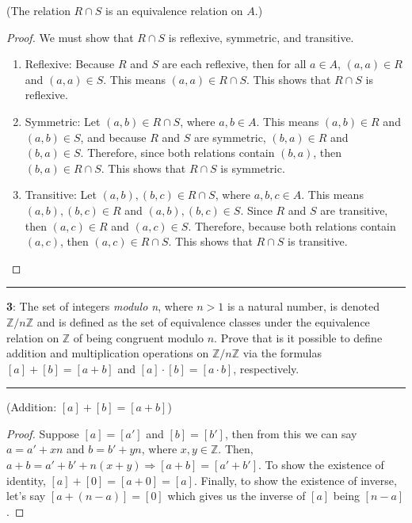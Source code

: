 \documentclass[11pt]{article}
\newcommand\question[2]{\vspace{.25in}\hrule\textbf{#1}: #2\vspace{.5em}\hrule\vspace{.10in}}
\renewcommand\part[1]{\vspace{.10in}(#1)\par}
\newcommand{\Z}{\mathbb{Z}}
\begin{document}
\part{The relation $R \cap S$ is an equivalence relation on $A$.}
\begin{proof}
	We must show that $R \cap S$ is reflexive, symmetric, and transitive.
	\begin{enumerate}
		\item Reflexive: Because $R$ and $S$ are each reflexive, then for all $a \in A$, $(a,a) \in R$ and $(a,a) \in S$. This means $(a,a) \in R \cap S$. This shows that $R \cap S$ is reflexive.

		\item Symmetric: Let $(a,b) \in R \cap S$, where $a,b \in A$. This means $(a,b) \in R$ and $(a,b) \in S$, and because $R$ and $S$ are symmetric, $(b,a) \in R$ and $(b,a) \in S$. Therefore, since both relations contain $(b,a)$, then $(b,a) \in R \cap S$. This shows that $R \cap S$ is symmetric.

		\item Transitive: Let $(a,b),(b,c) \in R \cap S$, where $a,b,c \in A$. This means $(a,b),(b,c) \in R$ and $(a,b),(b,c) \in S$. Since $R$ and $S$ are transitive, then $(a,c) \in R$ and $(a,c) \in S$. Therefore, because both relations contain $(a,c)$, then $(a,c) \in R \cap S$. This shows that $R \cap S$ is transitive.
	\end{enumerate}
\end{proof}

\question{3}{The set of integers \textit{modulo n}, where $n > 1$ is a natural number, is denoted $\Z/n\Z$ and is defined as the set of equivalence classes under the equivalence relation on $\Z$ of being congruent modulo $n$. Prove that is it possible to define addition and multiplication operations on $\Z/n\Z$ via the formulas $[a]+[b] = [ a + b]$ and $[a] \cdot [b] = [ a \cdot b]$, respectively.}

\part{Addition: $[a] +[b] = [a+b]$}
\begin{proof}
	Suppose $[a] = [a']$ and $[b]=[b']$, then from this we can say $a = a'+xn$ and $b = b'+yn$, where $x,y \in \Z$. Then, $a+b = a' + b' + n(x + y) \Rightarrow [a+b] = [a'+b']$. To show the existence of identity, $[a] + [0] = [a + 0] = [a]$. Finally, to show the existence of inverse, let's say $[a+(n-a)] = [0]$ which gives us the inverse of $[a]$ being $[n-a]$.
\end{proof}
\end{document}
